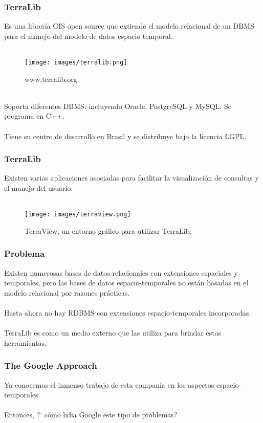 \documentclass[12pt]{beamer}
\begin{document}
\begin{frame}
\frametitle{TerraLib}
Es una librer\'ia GIS open source que extiende el modelo relacional de un DBMS para el manejo del modelo de datos espacio temporal.\\
\ \\
\begin{figure}
\begin{center}
\texttt{[image: images/terralib.png]}
\caption{www.terralib.org}
\end{center}
\end{figure}
\ \\
Soporta diferentes DBMS, incluyendo Oracle, PostgreSQL y MySQL. Se programa en C++.\\
\ \\
Tiene su centro de desarrollo en Brasil y se distribuye bajo la licencia LGPL.
\end{frame}

\begin{frame}
\frametitle{TerraLib}
Existen varias aplicaciones asociadas para facilitar la visualizaci\'on de consultas y el manejo del usuario.\\
\ \\
\begin{figure}
\centering
\texttt{[image: images/terraview.png]}
\caption{TerraView, un entorno gr\'afico para utilizar TerraLib.}
\end{figure}
\end{frame}

\begin{frame}
\frametitle{Problema}
Existen numerosas bases de datos relacionales con extensiones espaciales y temporales, pero las bases de datos espacio-temporales no est\'an basadas en el modelo relacional por razones pr\'acticas.\\
\ \\
Hasta ahora no hay RDBMS con extensiones espacio-temporales incorporadas.\\
\ \\
TerraLib es como un medio externo que las utiliza para brindar estas herramientas.
\end{frame}

\begin{frame}
\frametitle{The Google Approach}
Ya conocemos el inmenso trabajo de esta compan\'ia en los aspectos espacio-temporales.\\
\ \\
Entonces, ?` c\'omo lidia Google este tipo de problemas? 
\end{frame}
\end{document}
